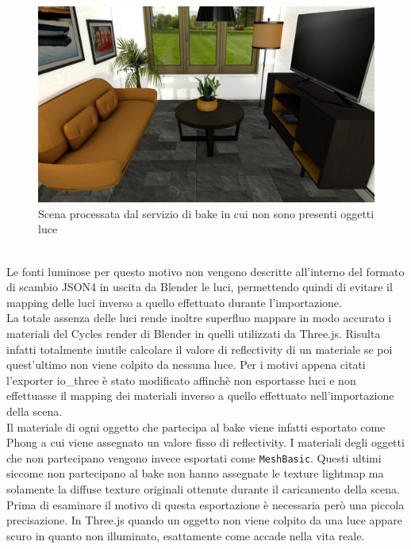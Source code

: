 \begin{figure}[htb]
 \centering
 \includegraphics[width=1\linewidth]{images/chapter_baking_service/bake_no_luci.png}\hfill
 \caption[Scena processata dal servizio di bake ]{Scena processata dal servizio di bake in cui non sono presenti oggetti luce}
 \label{fig:baking_service_bake_no_luci}
\end{figure}
\\
Le fonti luminose per questo motivo non vengono descritte all’interno del formato di scambio JSON4 in uscita da Blender  le luci, permettendo quindi di evitare il mapping delle luci inverso a quello effettuato durante l’importazione.
\\
La totale assenza delle luci rende inoltre superfluo mappare in modo accurato i materiali del Cycles render di Blender in quelli utilizzati da Three.js. 
Risulta infatti totalmente inutile calcolare il valore di reflectivity di un materiale se poi quest’ultimo non viene colpito da nessuna luce.
Per i motivi appena citati l’exporter io\_three è stato modificato affinchè non esportasse luci e non effettuasse il mapping dei materiali inverso a quello effettuato nell’importazione della scena.
\\
Il materiale di ogni oggetto che partecipa al bake viene infatti esportato come Phong a cui viene assegnato un valore fisso di reflectivity.
I materiali degli oggetti che non partecipano vengono invece esportati come \texttt{MeshBasic}.
Questi ultimi siccome non partecipano al bake non hanno assegnate le texture lightmap ma solamente la diffuse texture originali ottenute durante il caricamento della scena.
Prima di esaminare il motivo di questa esportazione è necessaria però una piccola precisazione. 
In Three.js quando un oggetto non viene colpito da una luce appare scuro in quanto non illuminato, esattamente come accade nella vita reale.
